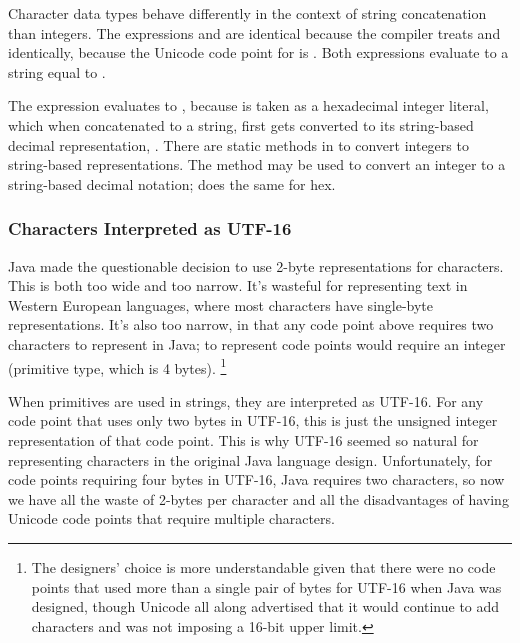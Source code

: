Character data types behave differently in the context of string
concatenation than integers.  The expressions  and
 are identical because the compiler treats
 and  identically, because the Unicode
code point for  is .  Both expressions
evaluate to a string equal to .  

The expression  evaluates to ,
because  is taken as a hexadecimal integer literal, which
when concatenated to a string, first gets converted to its
string-based decimal representation, .  There are static methods in
 to convert integers to string-based
representations.  The method  may be used
to convert an integer to a string-based decimal notation;
 does the same for hex.

\subsubsection{Characters Interpreted as UTF-16}

Java made the questionable decision to use 2-byte representations for
characters.  This is both too wide and too narrow.  It's wasteful for
representing text in Western European languages, where most characters
have single-byte representations.  It's also too narrow, in that
any code point above  requires two characters to
represent in Java; to represent code points would require an
integer (primitive  type, which is 4 bytes).
%
\footnote{The designers' choice is more understandable given that there were no
code points that used more than a single pair of bytes for UTF-16 when
Java was designed, though Unicode all along advertised that it would
continue to add characters and was not imposing a 16-bit upper limit.}

When  primitives are used in strings, they are interpreted
as UTF-16.  For any code point that uses only two bytes in UTF-16,
this is just the unsigned integer representation of that code point.
This is why UTF-16 seemed so natural for representing characters in
the original Java language design.  Unfortunately, for code points
requiring four bytes in UTF-16, Java requires two characters, so now
we have all the waste of 2-bytes per character and all the
disadvantages of having Unicode code points that require multiple
characters.


